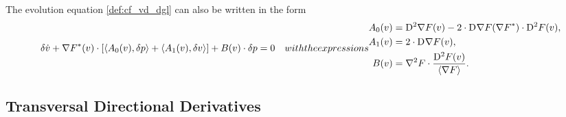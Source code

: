 


The evolution equation \eqref{def:cf_vd_dgl}
can also be written in the form
\begin{subequations}
    \begin{align}
        \vardiff \dot{ v }  +
        \darg{F}( v ) \mult
        [   \skap{ A_0( v ) }{ \vardiff p }  + 
            \skap{ A_1( v ) }{ \vardiff v }     ]  +
        B( v ) \mult \vardiff p
        &=  0
    \end{align}
    with the expressions
    \begin{align}
        A_0( v )  &=
        \diff{2}{\grad{F}}( v )  -
        2 \mult \diff{}{\grad{F}}( \darg{F} ) \mult \diff{2}{F}( v ) ,
        \\
        A_1( v )  &=
        2 \mult \diff{}{\grad{F}}( v ) ,
        \\
        B( v )  &=
        \nabla^2F \mult \frac{ \diff{2}{F}(v ) }{ \skaq{ \grad{F} } } .
    \end{align}
\end{subequations}


\subsection{Transversal Directional Derivatives}



